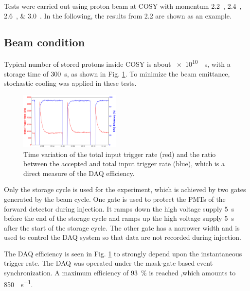\documentclass[number,5p]{elsarticle}
\begin{document}
Tests were carried out using proton beam at COSY with momentum
\SIlist[list-units=single]{2.2;2.4;2.6;3.0}{\momentum}.
In the following, the results from \SI{2.2}{\momentum} are shown as an example.

\subsection{Beam condition}
\label{sec:beam}
Typical number of stored protons inside COSY is about \SI[per-mode=reciprocal]{e10}{\per\second}, with a storage time of \SI{300}{\second}, as shown in Fig. \ref{fig:beam}.
To minimize the beam emittance, stochastic cooling \cite{cooling} was applied in these tests.
\begin{figure}[h]
  \centering
  \includegraphics[width=0.45\textwidth]{./daq_efficiency.png}
  \caption{Time variation of the total input trigger rate (red) and the ratio between the accepted and total input trigger rate (blue), which is a direct measure of the DAQ efficiency.}
  \label{fig:beam}
\end{figure}

Only the storage cycle is used for the experiment, which is achieved by two
gates generated by the beam cycle.
One gate is used to protect the PMTs of the forward detector during injection.
It ramps down the high voltage supply \SI{5}{\second} before the end of the
storage cycle and ramps up the high voltage supply \SI{5}{\second} after the start of the storage cycle.
The other gate has a narrower width and is used to control the DAQ system so that data are not recorded during injection.

The DAQ efficiency is seen in Fig. \ref{fig:beam} to strongly depend upon the
instantaneous trigger rate.
The DAQ was operated under the mask-gate based event synchronization.
A maximum efficiency of \SI{93}{\percent} is reached ,which amounts to \SI{850}{\event\per\second}.
\end{document}
